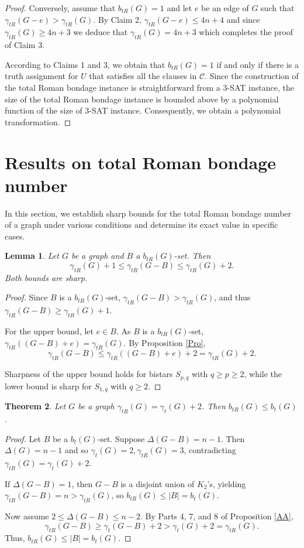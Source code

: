 \documentclass[12pt,reqno]{amsart}
\theoremstyle{plain}
\newtheorem{theorem}{Theorem}
\newtheorem{lemma}[theorem]{Lemma}
\numberwithin{equation}{section}
\begin{document}
\begin{proof}
Conversely, assume that $b_{tR}(G)=1$ and let $e$ be an edge of $G$ such
that $\gamma _{tR}(G-e)>\gamma _{tR}(G)$. By Claim 2, $\gamma _{tR}(G-e)\leq
4n+4$ and since $\gamma _{tR}(G)\geq 4n+3$ we deduce that $\gamma_{tR}(G)=4n+3$ which completes the proof of Claim 3.

According to Claims 1 and 3, we obtain that $b_{tR}(G)=1$ if and only if
there is a truth assignment for $U$ that satisfies all the clauses in $\mathcal{C}$. Since the construction of the total Roman bondage instance is straightforward from a 3-SAT instance, the size of the total Roman bondage
instance is bounded above by a polynomial function of the size of 3-SAT
instance. Consequently, we obtain a polynomial transformation.
\end{proof}



\section{ Results on total Roman bondage number}

In this section, we establish sharp bounds for the total Roman bondage number of a graph under various conditions and determine its exact value in specific cases.

\begin{lemma}
Let $G$ be a graph and $B$ a $b_{tR}(G)$-set. Then
$$\gamma_{tR}(G)+1 \leq \gamma_{tR}(G-B)\leq \gamma_{tR}(G)+2.$$
Both bounds are sharp.
\end{lemma}
\begin{proof}
Since $B$ is a $b_{tR}(G)$-set, $\gamma_{tR}(G - B) > \gamma_{tR}(G)$, and thus $\gamma_{tR}(G - B) \geq \gamma_{tR}(G) + 1$.

For the upper bound, let $e \in B$. As $B$ is a $b_{tR}(G)$-set, $\gamma_{tR}((G - B) + e) = \gamma_{tR}(G)$. By Proposition \ref{Pro}, 
$$\gamma_{tR}(G - B) \leq \gamma_{tR}((G - B) + e) + 2 = \gamma_{tR}(G) + 2.$$

Sharpness of the upper bound holds for bistars $S_{p,q}$ with $q \geq p \geq 2$, while the lower bound is sharp for $S_{1,q}$ with $q \geq 2$.
\end{proof}

\begin{theorem}\label{m1}
Let $G$ be a  graph $\gamma _{tR}(G)=\gamma _{t}(G)+2$. Then $b_{tR}(G)\leq b_{t}(G)$.
\end{theorem}
\begin{proof}
Let $B$ be a $b_{t}(G)$-set. Suppose $\Delta (G-B)=n-1$. Then $\Delta (G)=n-1$ and so $\gamma _t(G)=2, \gamma _{tR}(G)=3$, contradicting $\gamma_{tR}(G) = \gamma_t(G) + 2$. 

If $\Delta(G - B) = 1$, then $G - B$ is a disjoint union of $K_2$'s, yielding $\gamma_{tR}(G - B) = n > \gamma_{tR}(G)$, so $b_{tR}(G) \leq |B| = b_t(G)$.

Now assume $2 \leq \Delta(G - B) \leq n - 2$. By Parts 4, 7, and 8 of Proposition \ref{AA},
$$\gamma_{tR}(G - B) \geq \gamma_t(G - B) + 2 > \gamma_t(G) + 2 = \gamma_{tR}(G).$$
Thus, $b_{tR}(G) \leq |B| = b_t(G)$.
\end{proof}
\end{document}
